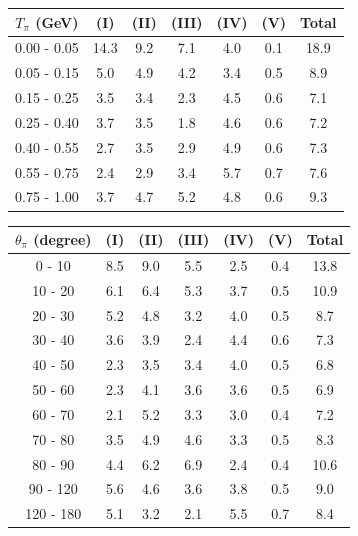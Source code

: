 \documentclass[aps, prd, reprint,showpacs,  preprintnumbers,amsmath,amssymb,superscriptaddress, nofootinbib]{revtex4-1}
\makeatletter
\renewenvironment{table}
  {\def\@captype{table}}
  {}
\makeatother
\begin{document}
\vspace{1cm}

\begin{table}
\centering
\begin{tabular}{ccccccc}
\hline
$T_{\pi}$ (GeV) & (I) & (II) & (III) & (IV) & (V) & Total \\
\hline
   0.00 - 0.05 & 14.3 &  9.2 &  7.1 &  4.0 &  0.1 & 18.9 \\
   0.05 - 0.15 &  5.0 &  4.9 &  4.2 &  3.4 &  0.5 &  8.9 \\
   0.15 - 0.25 &  3.5 &  3.4 &  2.3 &  4.5 &  0.6 &  7.1 \\
   0.25 - 0.40 &  3.7 &  3.5 &  1.8 &  4.6 &  0.6 &  7.2 \\
   0.40 - 0.55 &  2.7 &  3.5 &  2.9 &  4.9 &  0.6 &  7.3 \\
   0.55 - 0.75 &  2.4 &  2.9 &  3.4 &  5.7 &  0.7 &  7.6 \\
   0.75 - 1.00 &  3.7 &  4.7 &  5.2 &  4.8 &  0.6 &  9.3 \\
\hline\hline
\end{tabular}
\caption{Fractional systematic uncertainties (in percent) for $d\sigma/dT_\pi$.}
\label{tb:syst-pion-KE}
\end{table}

\vspace{1cm}

\begin{table}
\centering
\begin{tabular}{ccccccc}
\hline
$\theta_{\pi}$ (degree) & (I) & (II) & (III) & (IV) & (V) & Total \\
\hline
        0 - 10 &  8.5 &  9.0 &  5.5 &  2.5 &  0.4 & 13.8 \\
       10 - 20 &  6.1 &  6.4 &  5.3 &  3.7 &  0.5 & 10.9 \\
       20 - 30 &  5.2 &  4.8 &  3.2 &  4.0 &  0.5 &  8.7 \\
       30 - 40 &  3.6 &  3.9 &  2.4 &  4.4 &  0.6 &  7.3 \\
       40 - 50 &  2.3 &  3.5 &  3.4 &  4.0 &  0.5 &  6.8 \\
       50 - 60 &  2.3 &  4.1 &  3.6 &  3.6 &  0.5 &  6.9 \\
       60 - 70 &  2.1 &  5.2 &  3.3 &  3.0 &  0.4 &  7.2 \\
       70 - 80 &  3.5 &  4.9 &  4.6 &  3.3 &  0.5 &  8.3 \\
       80 - 90 &  4.4 &  6.2 &  6.9 &  2.4 &  0.4 & 10.6 \\
      90 - 120 &  5.6 &  4.6 &  3.6 &  3.8 &  0.5 &  9.0 \\
     120 - 180 &  5.1 &  3.2 &  2.1 &  5.5 &  0.7 &  8.4 \\
\hline\hline
\end{tabular}
\caption{Fractional systematic uncertainties (in percent) for $d\sigma/d\theta_\pi$.}
\label{tb:syst-pion-angle}
\end{table}
\end{document}

